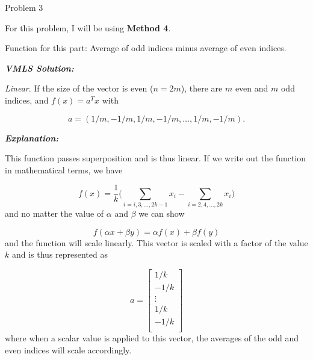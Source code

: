 \begin{problem}{Problem 3}
    \begin{Highlight}
        For this problem, I will be using \textbf{Method 4}. \vspace*{1em}

        Function for this part: Average of odd indices minus average of even indices. \vspace*{1em}

        \textbf{\textit{VMLS Solution:}} \vspace*{1em}

        \textit{Linear}. If the size of the vector is even ($n = 2m$), there are $m$ even and $m$ odd indices, and $f(x) = a^{T}x$ with

        \begin{equation}
            a = (1/m, -1/m, 1/m, -1/m, \dots, 1/m, -1/m).
        \end{equation}

        \textbf{\textit{Explanation:}} \vspace*{1em}

        This function passes superposition and is thus linear. If we write out the function in mathematical terms, we have

        \begin{equation}
            f(x) = \frac{1}{k} \Bigg(\sum_{i = i,3,\dots, 2k-1} x_{i} - \sum_{i = 2,4,\dots, 2k} x_{i}\Bigg)
        \end{equation}
        and no matter the value of $\alpha$ and $\beta$ we can show

        \begin{equation}
            f(\alpha x + \beta y) = \alpha f(x) + \beta f(y)
        \end{equation}
        and the function will scale linearly. This vector is scaled with a factor of the value $k$ and is thus represented as

        \begin{equation}
            a = 
            \begin{bmatrix}
                1/k \\
                -1/k \\
                \vdots \\
                1/k \\
                -1/k \\
            \end{bmatrix}
        \end{equation}
        where when a scalar value is applied to this vector, the averages of the odd and even indices will scale accordingly.
    \end{Highlight}


\end{problem}
